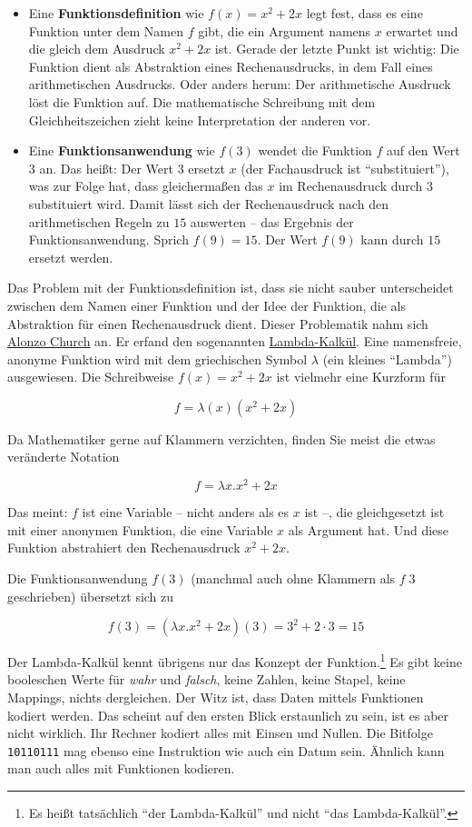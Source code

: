 \begin{itemize}
\item Eine {\bf Funktionsdefinition} wie $f(x)=x^2+2x$ legt fest, dass es eine Funktion unter dem Namen $f$ gibt, die ein Argument namens $x$ erwartet und die gleich dem Ausdruck $x^2+2x$ ist. Gerade der letzte Punkt ist wichtig: Die Funktion dient als Abstraktion eines Rechenausdrucks, in dem Fall eines arithmetischen Ausdrucks. Oder anders herum: Der arithmetische Ausdruck löst die Funktion auf. Die mathematische Schreibung mit dem Gleichheitszeichen zieht keine Interpretation der anderen vor.
\item Eine {\bf Funktionsanwendung} wie $f(3)$ wendet die Funktion $f$ auf den Wert $3$ an. Das heißt: Der Wert $3$ ersetzt $x$ (der Fachausdruck ist "`substituiert"'), was zur Folge hat, dass gleichermaßen das $x$ im Rechenausdruck durch $3$ substituiert wird. Damit lässt sich der Rechenausdruck nach den arithmetischen Regeln zu $15$ auswerten -- das Ergebnis der Funktionsanwendung. Sprich $f(9)=15$. Der Wert $f(9)$ kann durch $15$ ersetzt werden.
\end{itemize}

Das Problem mit der Funktionsdefinition ist, dass sie nicht sauber unterscheidet zwischen dem Namen einer Funktion und der Idee der Funktion, die als Abstraktion für einen Rechenausdruck dient. Dieser Problematik nahm sich \href{http://en.wikipedia.org/wiki/Alonzo_Church}{\sc Alonzo Church} an. Er erfand den sogenannten \href{http://de.wikipedia.org/wiki/Lambda-Kalk%C3%BCl}{Lambda-Kalkül}.
Eine namensfreie, anonyme Funktion wird mit dem griechischen Symbol $\lambda$ (ein kleines "`Lambda"') ausgewiesen. Die Schreibweise $f(x)=x^2+2x$ ist vielmehr eine Kurzform für

$$f = \lambda(x)(x^2+2x)$$

Da Mathematiker gerne auf Klammern verzichten, finden Sie meist die etwas veränderte Notation

$$f = \lambda x.x^2+2x$$

Das meint: $f$ ist eine Variable -- nicht anders als es $x$ ist --, die gleichgesetzt ist mit einer anonymen Funktion, die eine Variable $x$ als Argument hat. Und diese Funktion abstrahiert den Rechenausdruck $x^2+2x$.

Die Funktionsanwendung $f(3)$ (manchmal auch ohne Klammern als $f\; 3$ geschrieben) übersetzt sich zu

$$f(3) = (\lambda x.x^2+2x)(3) = 3^2+2\cdot 3 = 15$$

Der Lambda-Kalkül kennt übrigens nur das Konzept der Funktion.\footnote{Es heißt tatsächlich "`der Lambda-Kalkül"' und nicht "`das Lambda-Kalkül"'.} Es gibt keine booleschen Werte für \emph{wahr} und \emph{falsch}, keine Zahlen, keine Stapel, keine Mappings, nichts dergleichen. Der Witz ist, dass Daten mittels Funktionen kodiert werden. Das scheint auf den ersten Blick erstaunlich zu sein, ist es aber nicht wirklich. Ihr Rechner kodiert alles mit Einsen und Nullen. Die Bitfolge \verb|10110111| mag ebenso eine Instruktion wie auch ein Datum sein. Ähnlich kann man auch alles mit Funktionen kodieren.

